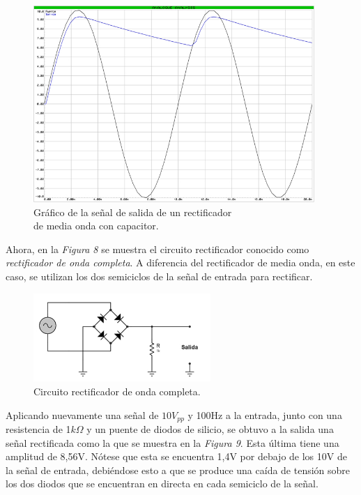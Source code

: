 \documentclass{article}
\begin{document}
\newpage
\begin{figure}[h]
	\centering
	\includegraphics[width=0.95\textwidth]{images/4-4-4-grafico-circuito-rectificador-media-onda-con-filtro.jpg}
	\medskip
	\caption{Gráfico de la señal de salida de un rectificador\\ de media onda con capacitor.}
\end{figure}
\bigskip\bigskip


	Ahora, en la \textit{Figura 8} se muestra el circuito rectificador conocido como \textit{rectificador de onda completa}. A diferencia del rectificador de media onda, en este caso, se utilizan los dos semiciclos  de la señal de entrada para rectificar.
\bigskip\bigskip
	

\begin{figure}[h]
	\centering
	\includegraphics[width=0.60\textwidth]{images/4-4-5-circuito-rectificador-onda-completa.jpg}
	\medskip
	\caption{Circuito rectificador de onda completa.}
\end{figure}
\bigskip\bigskip


	Aplicando nuevamente una señal de $10V_{pp}$ y 100Hz a la entrada, junto con una resistencia de 1$k\Omega$ y un puente de diodos de silicio, se obtuvo a la salida una señal rectificada como la que se muestra en la \textit{Figura 9}. Esta última tiene una amplitud de 8,56V. Nótese que esta se encuentra 1,4V por debajo de los 10V de la señal de entrada, debiéndose esto a que se produce una caída de tensión sobre los dos diodos que se encuentran en directa en cada semiciclo de la señal. 
\bigskip
\end{document}
